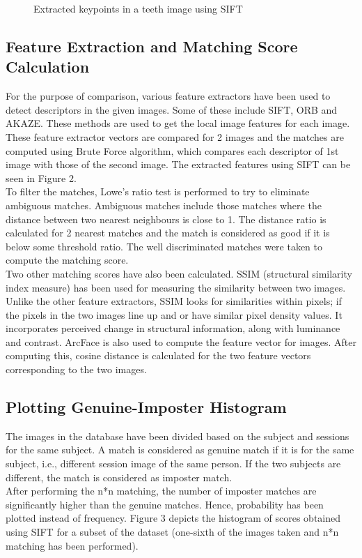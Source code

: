 \documentclass{article}
\begin{document}
\begin{figure}[!htb]
\begin{minipage}{0.48\textwidth}
     \caption{Extracted keypoints in a teeth image using SIFT}\label{Fig:Data2}
   \end{minipage}
\end{figure}

\subsection{Feature Extraction and Matching Score Calculation}
For the purpose of comparison, various feature extractors have been used to detect descriptors in the given images. Some of these include SIFT, ORB and AKAZE. These methods are used to get the local image features for each image. These feature extractor vectors are compared for 2 images and the matches are computed using Brute Force algorithm, which compares each descriptor of 1st image with those of the second image. The extracted features using SIFT can be seen in Figure 2.\\
To filter the matches, Lowe's ratio test is performed to try to eliminate ambiguous matches. Ambiguous matches include those matches where the distance between two nearest neighbours is close to 1. The distance ratio is calculated for 2 nearest matches and the match is considered as good if it is below some threshold ratio. The well discriminated matches were taken to compute the matching score.\\
Two other matching scores have also been calculated. SSIM (structural similarity index measure) has been used for measuring the similarity between two images. Unlike the other feature extractors, SSIM looks for similarities within pixels; if the pixels in the two images line up and or have similar pixel density values. It incorporates perceived change in structural information, along with luminance and contrast. ArcFace is also used to compute the feature vector for images. After computing this, cosine distance is calculated for the two feature vectors corresponding to the two images.

\subsection{Plotting Genuine-Imposter Histogram}
The images in the database have been divided based on the subject and sessions for the same subject. A match is considered as genuine match if it is for the same subject, i.e., different session image of the same person. If the two subjects are different, the match is considered as imposter match. \\After performing the n*n matching, the number of imposter matches are significantly higher than the genuine matches. Hence, probability has been plotted instead of frequency. Figure 3 depicts the histogram of scores obtained using SIFT for a subset of the dataset (one-sixth of the images taken and n*n matching has been performed).
\end{document}
